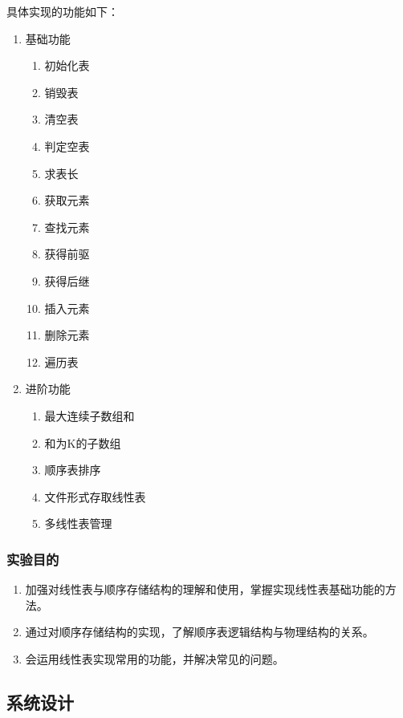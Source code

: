 \documentclass[supercite]{Experimental_Report}
\theoremstyle{definition}
\begin{document}
具体实现的功能如下：
\begin{enumerate}
	\item 基础功能
	\begin{enumerate}
		\item 初始化表
		\item 销毁表
		\item 清空表
		\item 判定空表
		\item 求表长
		\item 获取元素
		\item 查找元素
		\item 获得前驱
		\item 获得后继
		\item 插入元素
		\item 删除元素
		\item 遍历表
	\end{enumerate}
	\item 进阶功能

	\color{black}\begin{enumerate}
		\item 最大连续子数组和
		\item 和为K的子数组
		\item 顺序表排序
		\item 文件形式存取线性表
		\item 多线性表管理
	\end{enumerate}
\end{enumerate}

\subsubsection{实验目的}

\begin{enumerate}
	\item 加强对线性表与顺序存储结构的理解和使用，掌握实现线性表基础功能的方法。
	\item 通过对顺序存储结构的实现，了解顺序表逻辑结构与物理结构的关系。
	\item 会运用线性表实现常用的功能，并解决常见的问题。
\end{enumerate}

\subsection{系统设计}
\end{document}
